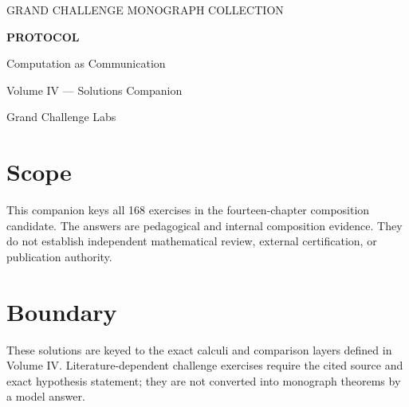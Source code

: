\documentclass[11pt,openany]{book}
\begin{document}
\frontmatter
\begin{titlepage}
\centering\vspace*{1.2cm}
{\small\sffamily GRAND CHALLENGE MONOGRAPH COLLECTION\par}\vspace{.8cm}
{\Huge\bfseries PROTOCOL\par}\vspace{.2cm}
{\Large Computation as Communication\par}\vspace{.3cm}
{\large Volume IV --- Solutions Companion\par}
\vfill {\large Grand Challenge Labs\par}
\end{titlepage}
\chapter*{Scope}
This companion keys all 168 exercises in the fourteen-chapter composition candidate.
The answers are pedagogical and internal composition evidence. They do not establish independent
mathematical review, external certification, or publication authority.
\tableofcontents
\mainmatter
















\backmatter
\chapter*{Boundary}
These solutions are keyed to the exact calculi and comparison layers defined in Volume IV.
Literature-dependent challenge exercises require the cited source and exact hypothesis statement;
they are not converted into monograph theorems by a model answer.
\end{document}

